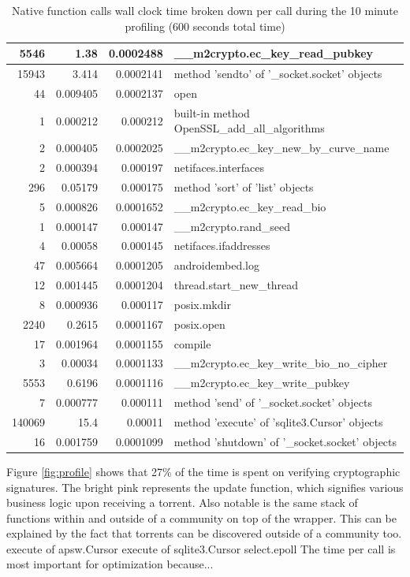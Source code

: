 \begin{table}
\begin{tabular}{*{3}{r} | l}
		5546 & 1.38 & 0.0002488 & \_\_m2crypto.ec\_key\_read\_pubkey \\ \hline
		15943 & 3.414 & 0.0002141 & method 'sendto' of '\_socket.socket' objects \\ \hline
		44 & 0.009405 & 0.0002137 & open \\ \hline
		1 & 0.000212 & 0.000212 & built-in method OpenSSL\_add\_all\_algorithms \\ \hline
		2 & 0.000405 & 0.0002025 & \_\_m2crypto.ec\_key\_new\_by\_curve\_name \\ \hline
		2 & 0.000394 & 0.000197 & netifaces.interfaces \\ \hline
		296 & 0.05179 & 0.000175 & method 'sort' of 'list' objects \\ \hline
		5 & 0.000826 & 0.0001652 & \_\_m2crypto.ec\_key\_read\_bio \\ \hline
		1 & 0.000147 & 0.000147 & \_\_m2crypto.rand\_seed \\ \hline
		4 & 0.00058 & 0.000145 & netifaces.ifaddresses \\ \hline
		47 & 0.005664 & 0.0001205 & androidembed.log \\ \hline
		12 & 0.001445 & 0.0001204 & thread.start\_new\_thread \\ \hline
		8 & 0.000936 & 0.000117 & posix.mkdir \\ \hline
		2240 & 0.2615 & 0.0001167 & posix.open \\ \hline
		17 & 0.001964 & 0.0001155 & compile \\ \hline
		3 & 0.00034 & 0.0001133 & \_\_m2crypto.ec\_key\_write\_bio\_no\_cipher \\ \hline
		5553 & 0.6196 & 0.0001116 & \_\_m2crypto.ec\_key\_write\_pubkey \\ \hline
		7 & 0.000777 & 0.000111 & method 'send' of '\_socket.socket' objects \\ \hline
		140069 & 15.4 & 0.00011 & method 'execute' of 'sqlite3.Cursor' objects \\ \hline
		16 & 0.001759 & 0.0001099 & method 'shutdown' of '\_socket.socket' objects \\ \hline
	\end{tabular}
	\caption{Native function calls wall clock time broken down per call during the 10 minute profiling (600 seconds total time)}
	\label{table:profiling_details}
\end{table}
Figure \ref{fig:profile} shows that 27\% of the time is spent on verifying cryptographic signatures.
The bright pink represents the update function, which signifies various business logic upon receiving a torrent.
Also notable is the same stack of functions within and outside of a community on top of the wrapper.
This can be explained by the fact that torrents can be discovered outside of a community too.
execute of apsw.Cursor
execute of sqlite3.Cursor
select.epoll \cite{http://stackoverflow.com/questions/2032598/caveats-of-select-poll-vs-epoll-reactors-in-twisted}
The time per call is most important for optimization because...

